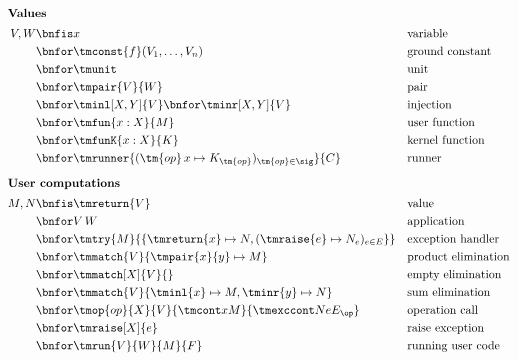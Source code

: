 \begin{figure}[tp]
  \parbox{\textwidth}{
  \centering
  \small
  \abovedisplayskip=0pt
  \begin{align*}
  \intertext{\textbf{Values}}
  V, W
  \bnfis& x                                       & &\text{variable} \\
  \bnfor& \tmconst{f}(V_1,\ldots,V_n)                                       & &\text{ground constant} \\
  \bnfor& \tmunit                                 & &\text{unit} \\
  \bnfor& \tmpair{V}{W}                           & &\text{pair} \\
  \bnfor& \tminl[X,Y]{V} \bnfor \tminr[X,Y]{V}    & &\text{injection} \\
  \bnfor& \tmfun{x : X}{M}                        & &\text{user function} \\
  \bnfor& \tmfunK{x : X}{K}                       & &\text{kernel function} \\
  \bnfor& \tmrunner{(\tm{op}\,x \mapsto K_{\tm{op}})_{\tm{op} \in \sig}}{C}
                                                  & &\text{runner}
  \\[1ex]
  \intertext{\textbf{User computations}}
  M, N
  \bnfis& \tmreturn{V}                            & &\text{value} \\
  \bnfor& V\,W                                    & &\text{application} \\
  \bnfor& \tmtry{M}{
          \{ \tmreturn{x} \mapsto N,
             (\tmraise{e} \mapsto N_e)_{e \in E} \}
          }
                                                  & &\text{exception handler} \\
  \bnfor& \tmmatch{V}{\tmpair{x}{y} \mapsto M}    & &\text{product elimination} \\
  \bnfor& \tmmatch[X]{V}{}                        & &\text{empty elimination} \\
  \bnfor& \tmmatch{V}{\tminl{x} \mapsto M, \tminr{y} \mapsto N}
                                                  & &\text{sum elimination} \\
  \bnfor& \tmop{op}{X}{V}{\tmcont x M}{\tmexccont N e {E_\op}}
                                                  & &\text{operation call} \\
  \bnfor& \tmraise[X]{e}                          & &\text{raise exception} \\
  \bnfor& \tmrun{V}{W}{M}{F} 
                                                  & &\text{running user code} \\

\end{align*}}
\end{figure}
